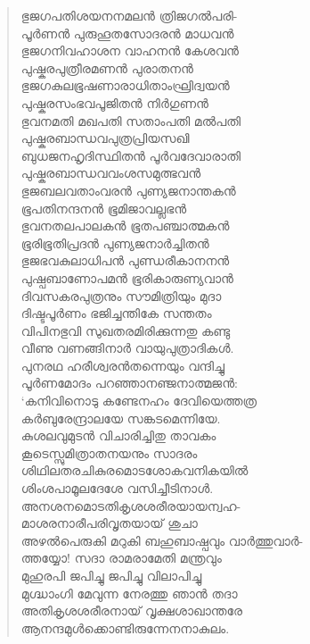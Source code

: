 \begin{verse}
ഭുജഗപതിശയനനമലന്‍ ത്രിജഗല്‍പരി-\\
പൂര്‍ണന്‍ പുരുഹൂതസോദരന്‍ മാധവന്‍\\
ഭുജഗനിവഹാശന വാഹനന്‍ കേശവന്‍\\
പുഷ്കരപുത്രീരമണന്‍ പുരാതനന്‍\\
ഭുജഗകുലഭൂഷണാരാധിതാംഘ്രിദ്വയന്‍\\
പുഷ്കരസംഭവപൂജിതന്‍ നിര്‍ഗുണന്‍\\
ഭുവനമതി മഖപതി സതാംപതി മല്‍പതി\\
പുഷ്കരബാന്ധവപുത്രപ്രിയസഖി\\
ബുധജനഹൃദിസ്ഥിതന്‍ പൂര്‍വദേവാരാതി\\
പുഷ്കരബാന്ധവവംശസമുത്ഭവന്‍\\
ഭുജബലവതാംവരന്‍ പുണ്യജനാന്തകന്‍\\
ഭൂപതിനന്ദനന്‍ ഭൂമിജാവല്ലഭന്‍\\
ഭുവനതലപാലകന്‍ ഭൂതപഞ്ചാത്മകന്‍\\
ഭൂരിഭൂതിപ്രദന്‍ പുണ്യജനാര്‍ച്ചിതന്‍\\
ഭുജഭവകുലാധിപന്‍ പുണ്ഡരീകാനനന്‍\\
പുഷ്പബാണോപമന്‍ ഭൂരികാരുണ്യവാന്‍\\
ദിവസകരപുത്രനും സൗമിത്രിയും മുദാ\\
ദിഷ്ടപൂര്‍ണം ഭജിച്ചന്തികേ സന്തതം\\
വിപിനഭുവി സുഖതരമിരിക്കുന്നതു കണ്ടു\\
വീണു വണങ്ങിനാര്‍ വായുപുത്രാദികള്‍.\\
പുനരഥ ഹരീശ്വരന്‍തന്നെയും വന്ദിച്ചു\\
പൂര്‍ണമോദം പറഞ്ഞാനഞ്ജനാത്മജന്‍:\\
‘കനിവിനൊടു കണ്ടേനഹം ദേവിയെത്തത്ര\\
കര്‍ബുരേന്ദ്രാലയേ സങ്കടമെന്നിയേ.\\
കുശലവുമുടന്‍ വിചാരിച്ചിതു താവകം\\
കൂടെസ്സുമിത്രാതനയനും സാദരം\\
ശിഥിലതരചികുരമൊടശോകവനികയില്‍\\
ശിംശപാമൂലദേശേ വസിച്ചീടിനാള്‍.\\
അനശനമൊടതികൃശശരീരയായന്വഹ-\\
മാശരനാരീപരിവൃതയായ് ശുചാ\\
അഴല്‍പെരുകി മറുകി ബഹുബാഷ്പവും വാര്‍ത്തുവാര്‍-\\
ത്തയ്യോ! സദാ രാമരാമേതി മന്ത്രവും\\
മുഹുരപി ജപിച്ചു ജപിച്ചു വിലാപിച്ചു\\
മുഗ്ദ്ധാംഗി മേവുന്ന നേരത്തു ഞാന്‍ തദാ\\
അതികൃശശരീരനായ് വൃക്ഷശാഖാന്തരേ\\
ആനന്ദമുള്‍ക്കൊണ്ടിരുന്നേനനാകുലം.\\

\end{verse}
